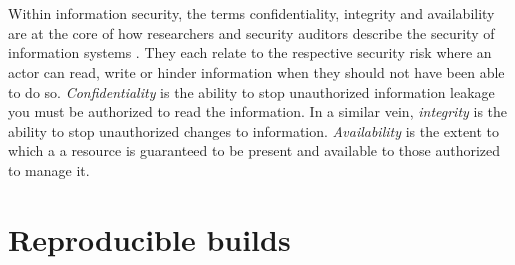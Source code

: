 \documentclass[english, biblatex, digitaloutput]{kththesis}
\begin{document}





\section{}

Within information security, the terms confidentiality, integrity and availability are at the core of how researchers and security auditors describe the security of information systems \cite{samonas_cia_nodate}. They each relate to the respective security risk where an actor can read, write or hinder information when they should not have been able to do so. \textit{Confidentiality} is the ability to stop unauthorized information leakage \ie you must be authorized to read the information. In a similar vein, \textit{integrity} is the ability to stop unauthorized changes to information. \textit{Availability} is the extent to which a a resource is guaranteed to be present and available to those authorized to manage it.

\section{}

\section{Reproducible builds}
\end{document}
